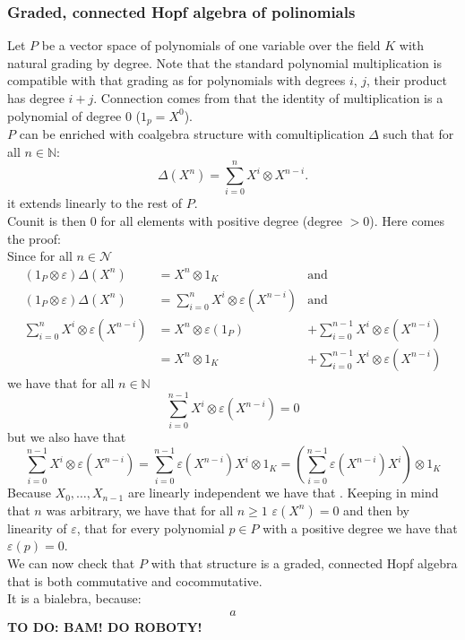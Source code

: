 \documentclass[a4paper]{article}
\newcommand{\todo}[1]{\hfill \break \textbf{\Huge TO DO: #1 \hfill \break}\normalsize}
\begin{document}
\subsubsection{Graded, connected Hopf algebra of polinomials}
Let $P$ be a vector space of polynomials of one variable over the field $K$ with natural grading by degree.
Note that the standard polynomial multiplication is compatible with that grading as for polynomials with
degrees $i$, $j$, their product has degree $i + j$. Connection comes from that the identity of
multiplication
is a polynomial of degree $0$ ($1_p = X^0$).  \\
$P$ can be enriched with coalgebra structure with comultiplication $\Delta$ such that for all
$n \in \mathbb{N}$:
\begin{equation*}
\Delta(X^n) = \sum^n_{i = 0} X^i \otimes X^{n-i}.
\end{equation*}
it extends linearly to the rest of $P$. \\
Counit is then $0$ for all elements with positive degree (degree $>0$). Here comes the proof: \\
Since for all $n \in \mathcal{N}$
\begin{align*}
(1_P \otimes \varepsilon )\Delta(X^n) &= X^n \otimes 1_K &\mathrm{and} \\
(1_P \otimes \varepsilon )\Delta(X^n) &= \sum^n_{i = 0} X^i \otimes \varepsilon(X^{n-i}) &\mathrm{and} \\
\sum^n_{i = 0} X^i \otimes \varepsilon(X^{n-i}) &= X^n \otimes \varepsilon(1_P) &+
\sum^{n-1}_{i=0} X^i \otimes \varepsilon(X^{n-i}) \\ &=
X^n \otimes 1_K &+ \sum^{n-1}_{i=0} X^i \otimes \varepsilon(X^{n-i})
\end{align*}
we have that for all $n \in \mathbb{N}$
\begin{equation*}
\sum^{n-1}_{i=0} X^i \otimes \varepsilon(X^{n-i}) = 0
\end{equation*}
but we also have that
\begin{equation*}
\sum^{n-1}_{i=0} X^i \otimes \varepsilon(X^{n-i}) = \sum^{n-1}_{i=0} \varepsilon(X^{n-i})X^i \otimes 1_K =
\left( \sum^{n-1}_{i=0} \varepsilon(X^{n-i})X^i \right)\otimes 1_K
\end{equation*}
Because $X_0, \dots, X_{n-1}$ are linearly independent we have that . Keeping in mind that $n$ was arbitrary, we have that for all $n \geq 1$
$\varepsilon(X^n) = 0$ and then by linearity of $\varepsilon$, that for every polynomial $p \in P$ with a
positive degree we have that $\varepsilon(p) = 0$. \\
We can now check that $P$ with that structure is a graded, connected Hopf algebra that is both commutative
and cocommutative. \\
It is a bialebra, because:
\begin{align*}
a
\end{align*}
\todo{BAM! DO ROBOTY!}
\end{document}
